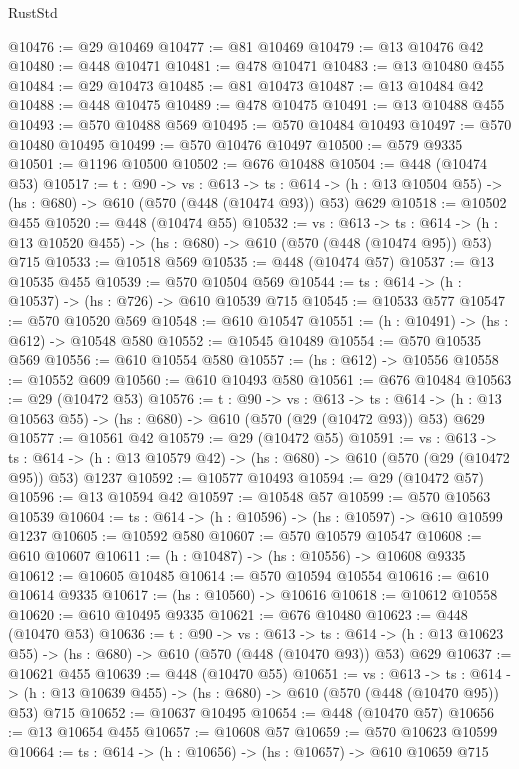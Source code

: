 \begin{lexlean}{RustStd}
\begin{coremodule}
@10476 := @29 @10469
@10477 := @81 @10469
@10479 := @13 @10476 @42
@10480 := @448 @10471
@10481 := @478 @10471
@10483 := @13 @10480 @455
@10484 := @29 @10473
@10485 := @81 @10473
@10487 := @13 @10484 @42
@10488 := @448 @10475
@10489 := @478 @10475
@10491 := @13 @10488 @455
@10493 := @570 @10488 @569
@10495 := @570 @10484 @10493
@10497 := @570 @10480 @10495
@10499 := @570 @10476 @10497
@10500 := @579 @9335
@10501 := @1196 @10500
@10502 := @676 @10488
@10504 := @448 (@10474 @53)
@10517 := {t : @90} ->
  {vs : @613} ->
  {ts : @614} -> (h : @13 @10504 @55) -> (hs : @680) -> @610 (@570 (@448 (@10474 @93)) @53) @629
@10518 := @10502 @455
@10520 := @448 (@10474 @55)
@10532 := {vs : @613} ->
  {ts : @614} -> (h : @13 @10520 @455) -> (hs : @680) -> @610 (@570 (@448 (@10474 @95)) @53) @715
@10533 := @10518 @569
@10535 := @448 (@10474 @57)
@10537 := @13 @10535 @455
@10539 := @570 @10504 @569
@10544 := {ts : @614} -> (h : @10537) -> (hs : @726) -> @610 @10539 @715
@10545 := @10533 @577
@10547 := @570 @10520 @569
@10548 := @610 @10547
@10551 := (h : @10491) -> (hs : @612) -> @10548 @580
@10552 := @10545 @10489
@10554 := @570 @10535 @569
@10556 := @610 @10554 @580
@10557 := (hs : @612) -> @10556
@10558 := @10552 @609
@10560 := @610 @10493 @580
@10561 := @676 @10484
@10563 := @29 (@10472 @53)
@10576 := {t : @90} ->
  {vs : @613} ->
  {ts : @614} -> (h : @13 @10563 @55) -> (hs : @680) -> @610 (@570 (@29 (@10472 @93)) @53) @629
@10577 := @10561 @42
@10579 := @29 (@10472 @55)
@10591 := {vs : @613} ->
  {ts : @614} -> (h : @13 @10579 @42) -> (hs : @680) -> @610 (@570 (@29 (@10472 @95)) @53) @1237
@10592 := @10577 @10493
@10594 := @29 (@10472 @57)
@10596 := @13 @10594 @42
@10597 := @10548 @57
@10599 := @570 @10563 @10539
@10604 := {ts : @614} -> (h : @10596) -> (hs : @10597) -> @610 @10599 @1237
@10605 := @10592 @580
@10607 := @570 @10579 @10547
@10608 := @610 @10607
@10611 := (h : @10487) -> (hs : @10556) -> @10608 @9335
@10612 := @10605 @10485
@10614 := @570 @10594 @10554
@10616 := @610 @10614 @9335
@10617 := (hs : @10560) -> @10616
@10618 := @10612 @10558
@10620 := @610 @10495 @9335
@10621 := @676 @10480
@10623 := @448 (@10470 @53)
@10636 := {t : @90} ->
  {vs : @613} ->
  {ts : @614} -> (h : @13 @10623 @55) -> (hs : @680) -> @610 (@570 (@448 (@10470 @93)) @53) @629
@10637 := @10621 @455
@10639 := @448 (@10470 @55)
@10651 := {vs : @613} ->
  {ts : @614} -> (h : @13 @10639 @455) -> (hs : @680) -> @610 (@570 (@448 (@10470 @95)) @53) @715
@10652 := @10637 @10495
@10654 := @448 (@10470 @57)
@10656 := @13 @10654 @455
@10657 := @10608 @57
@10659 := @570 @10623 @10599
@10664 := {ts : @614} -> (h : @10656) -> (hs : @10657) -> @610 @10659 @715

\end{coremodule}
\end{lexlean}

